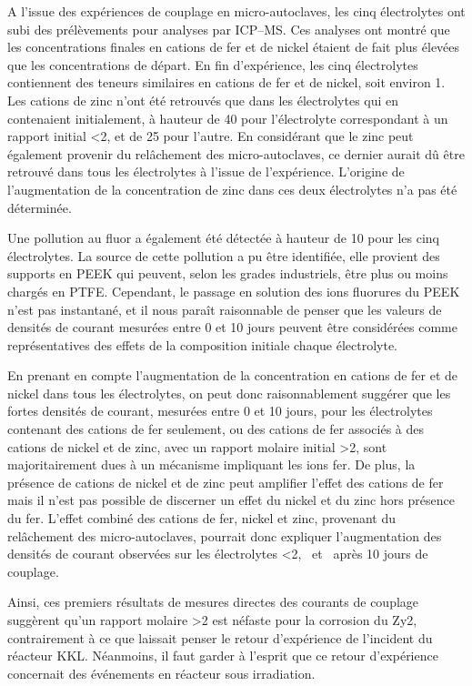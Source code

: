 \begin{refsection}
    A l’issue des expériences de couplage en micro-autoclaves, les cinq électrolytes ont subi des prélèvements
    pour analyses par ICP--MS. Ces analyses ont montré que les concentrations finales en cations de fer et de
    nickel étaient de fait plus élevées que les concentrations de départ. En fin d’expérience, les cinq électrolytes
    contiennent des teneurs similaires en cations de fer et de nickel, soit environ \SI{1}{\ppm}. Les cations de zinc n’ont été
    retrouvés que dans les électrolytes qui en contenaient initialement, à hauteur de \SI{40}{\ppb} pour l’électrolyte correspondant
    à un rapport initial \ratio <2, et de \SI{25}{\ppb} pour l’autre. En considérant que le zinc peut également
    provenir du relâchement des micro-autoclaves, ce dernier aurait dû être retrouvé dans tous les électrolytes à l’issue
    de l’expérience. L’origine de l’augmentation de la concentration de zinc dans ces deux électrolytes n’a pas été déterminée.

    Une pollution au fluor a également été détectée à hauteur de \SI{10}{\ppm} pour les cinq électrolytes. La source de cette
    pollution a pu être identifiée, elle provient des supports en PEEK qui peuvent, selon les grades industriels, être plus ou
    moins chargés en PTFE. Cependant, le passage en solution des ions fluorures du PEEK n’est pas instantané, et il
    nous paraît
    raisonnable de penser que les valeurs de densités de courant mesurées entre 0 et 10 jours peuvent être considérées 
    comme représentatives des effets de la composition initiale chaque électrolyte.

    En prenant en compte l’augmentation de la concentration en cations de fer et de nickel dans tous les électrolytes, on
    peut donc raisonnablement suggérer que les fortes densités de courant, mesurées entre 0 et 10 jours, pour les électrolytes
    contenant des cations de fer seulement, ou des cations de fer associés à des cations de nickel et de zinc, avec un
    rapport molaire initial \ratio >2, sont majoritairement dues à un mécanisme impliquant les ions fer.
    De plus, la présence de cations de nickel et de zinc peut amplifier l’effet des cations de fer mais il n’est pas possible
    de discerner un effet du nickel et du zinc hors présence du fer. L’effet combiné des cations de fer, nickel et zinc, provenant
    du relâchement des micro-autoclaves, pourrait donc expliquer l’augmentation des densités de courant observées
    sur les électrolytes \ratio <2, \NaSO\ et \water\ après 10 jours de couplage.

    Ainsi, ces premiers résultats de mesures directes des courants de couplage suggèrent qu’un rapport 
    molaire \ratio >2 est néfaste pour la corrosion du Zy2, contrairement à ce que laissait
    penser le retour d’expérience de l’incident du réacteur KKL. Néanmoins, il faut garder à l’esprit que ce
    retour d’expérience concernait des événements en réacteur sous irradiation.


\end{refsection}
